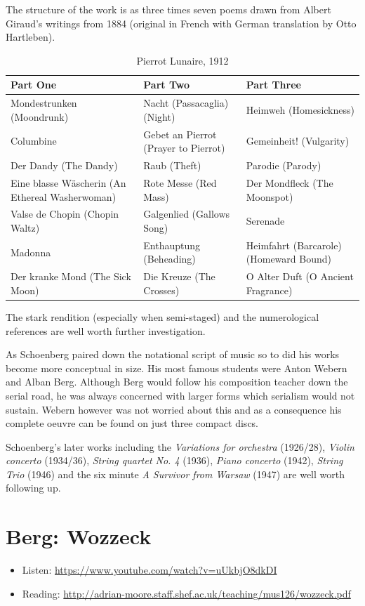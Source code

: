 The structure of the work is as three times seven poems drawn from Albert Giraud's writings from 1884 (original in French with German translation by Otto Hartleben).  

\begin{table}[h!]
\begin{tabular}{|p{5.0cm}|p{5.0cm}|p{5.0cm}|} \hline
\textbf{Part One} & \textbf{Part Two} & \textbf{Part Three} \\\hline
Mondestrunken (Moondrunk) & Nacht (Passacaglia) (Night) & Heimweh (Homesickness)\\\hline
Columbine & Gebet an Pierrot (Prayer to Pierrot) & Gemeinheit! (Vulgarity)\\\hline
Der Dandy (The Dandy) & Raub (Theft)  & Parodie (Parody)\\\hline
Eine blasse W\"ascherin (An Ethereal Washerwoman) &  Rote Messe (Red Mass) & Der Mondfleck (The Moonspot)\\\hline
Valse de Chopin (Chopin Waltz) & Galgenlied (Gallows Song)  & Serenade\\\hline
Madonna & Enthauptung (Beheading) & Heimfahrt (Barcarole) (Homeward Bound)\\\hline
Der kranke Mond (The Sick Moon) & Die Kreuze (The Crosses) & O Alter Duft (O Ancient Fragrance)\\\hline
\end{tabular}
\caption{Pierrot Lunaire, 1912}
\label{tab:pierrot}
\end{table}

The stark rendition (especially when semi-staged) and the numerological references are well worth further investigation. 

As Schoenberg paired down the notational script of music so to did his works become more conceptual in size. 
His most famous students were Anton Webern and Alban Berg. Although Berg would follow his composition teacher down the serial road, he was always concerned with larger forms which serialism would not sustain. Webern however was not worried about this and as a consequence his complete oeuvre can be found on just three compact discs. 

Schoenberg's later works including the \textit{Variations for orchestra} (1926/28), \textit{Violin concerto} (1934/36), \textit{String quartet No. 4} (1936), \textit{Piano concerto} (1942), \textit{String Trio} (1946)
and the six minute \textit{A Survivor from Warsaw} (1947) are well worth following up. 
 
\section{Berg: Wozzeck}
\begin{itemize}
\item Listen: \url{https://www.youtube.com/watch?v=uUkbjO8dkDI}
\item Reading: \url{http://adrian-moore.staff.shef.ac.uk/teaching/mus126/wozzeck.pdf}
\end{itemize}

